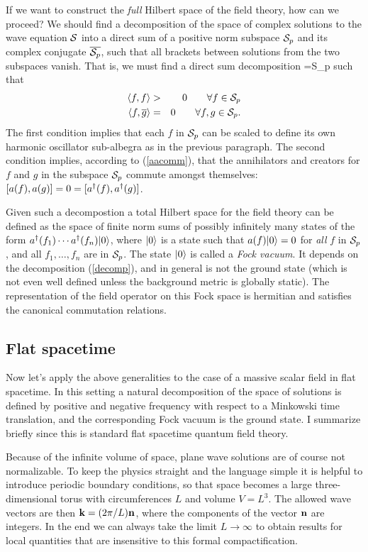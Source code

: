 \documentclass[12pt]{article}
\begin{document}
If we want to construct the {\it full} Hilbert space of the
field theory, how can we proceed? We should find a
decomposition of the space of complex solutions to the wave
equation $\cal S$ into a direct sum of a positive norm subspace
${\cal S}_p$ and its complex conjugate $\overline{{\cal S}_p}$,
such that all brackets between solutions from the two subspaces
vanish. That is, we must find a direct sum decomposition
%
={\cal S}_p \oplus{} 
\label{decomp}
\eeq
%
such that
%
\begin{eqnarray}
 \la f,f\ra &>& 0 \qquad \forall f\in {\cal S}_p\\
\la f,\overline{g}\ra &=& 0 \qquad \forall f,g\in {\cal S}_p.
\label{decompfg}
\end{eqnarray}
%
The first condition implies that each $f$ in ${\cal S}_p$ can
be scaled to define its own harmonic oscillator sub-albegra as
in the previous paragraph. The second condition implies,
according to (\ref{aacomm}), that the annihilators and creators
for $f$ and $g$ in the subspace ${\cal S}_p$ commute amongst
themselves: $[a(f),a(g)]=0=[a^\dagger(f),a^\dagger(g)]$. 

Given such a decompostion a total Hilbert space for the field theory can be defined 
as the space of finite
norm sums of possibly infinitely many states of the form
$a^\dagger(f_1)\cdots a^\dagger(f_n)|0\rangle$, where 
$|0\rangle$ is a state such that $a(f)|0\rangle=0$ for {\it all} $f$ in
${\cal S}_p$, and all $f_1,\dots,f_n$ are in
${\cal S}_p$. The state $|0\rangle$ is called a
{\it Fock vacuum}. It depends on the
decomposition (\ref{decomp}), and in general is not the ground
state (which is not even well defined unless the background metric
is globally static). The representation
of the field operator on this Fock space is hermitian and
satisfies the canonical commutation relations.  

\subsection{Flat spacetime}
\label{flat}

Now let's apply the above generalities to the case of a massive
scalar field in flat spacetime. In this setting
a natural decomposition of the space of solutions is
defined by positive and negative frequency 
with respect to a Minkowski time translation, and the corresponding
Fock vacuum is the ground state.
I summarize briefly since this is standard flat spacetime quantum field theory. 

Because of the infinite volume of space, plane wave solutions are of
course not normalizable. To keep the physics straight and the language
simple it is helpful
to introduce periodic boundary conditions, so that space
becomes a large three-dimensional torus with circumferences $L$
and volume $V=L^3$. The allowed wave vectors are then 
${\bf k}= (2\pi/L){\bf n}$, where the components of the vector
$\bf n$ are integers. In the end we can always take the limit
$L\rightarrow \infty$ to obtain results for local quantities that 
are insensitive to this formal compactification. 
\end{document}
